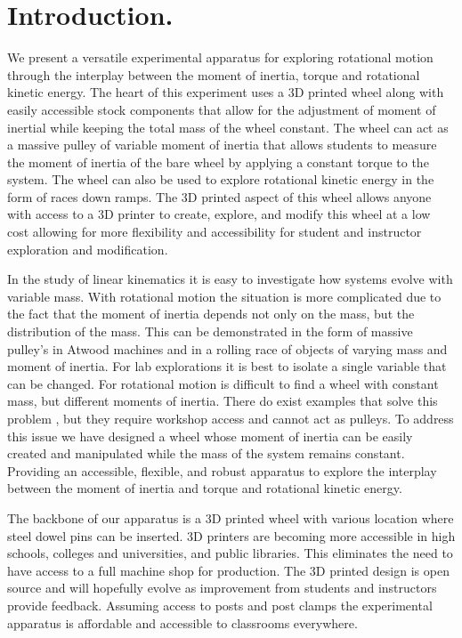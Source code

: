 \documentclass[prb,preprint]{revtex4-1}
\begin{document}
\section{Introduction.}
We present a versatile experimental apparatus for exploring rotational motion through the interplay between the moment of inertia, torque and rotational kinetic energy.  The heart of this experiment uses a 3D printed wheel along with easily accessible stock components that allow for the adjustment of moment of inertial while keeping the total mass of the wheel constant. The wheel can act as a massive pulley of variable moment of inertia that allows students to measure the moment of inertia of the bare wheel by applying a constant torque to the system.  The wheel can also be used to explore rotational kinetic energy in the form of races down ramps.  The 3D printed aspect of this wheel allows anyone with access to a 3D printer to create, explore, and modify this wheel at a low cost allowing for more flexibility and accessibility for student and instructor exploration and modification.

In the study of linear kinematics it is easy to investigate how systems evolve with variable mass.  With rotational motion the situation is more complicated due to the fact that the moment of inertia depends not only on the mass, but the distribution of the mass. This can be demonstrated in the form of massive pulley's in Atwood machines \cite{atwood} and in a rolling race of objects of varying mass and moment of inertia.  For lab explorations it is best to isolate a single variable that can be changed. For rotational motion is difficult to find a wheel with constant mass, but different moments of inertia.   There do exist examples that solve this problem \cite{spiderwheel,MoIInexpensive}, but they require workshop access and cannot act as pulleys. To address this issue we have designed a wheel whose moment of inertia can be easily created and manipulated while the mass of the system remains constant. Providing an accessible, flexible, and robust apparatus to explore the interplay between the moment of inertia and torque and rotational kinetic energy.  

The backbone of our apparatus is a 3D printed wheel with various location where steel dowel pins can be inserted.  3D printers are becoming more accessible in high schools, colleges and universities, and public libraries.  This eliminates the need to have access to a full machine shop for production.  The 3D printed design is open source and will hopefully evolve as improvement from students and instructors provide feedback.   Assuming access to posts and post clamps the experimental apparatus is affordable and accessible to classrooms everywhere.
\end{document}
